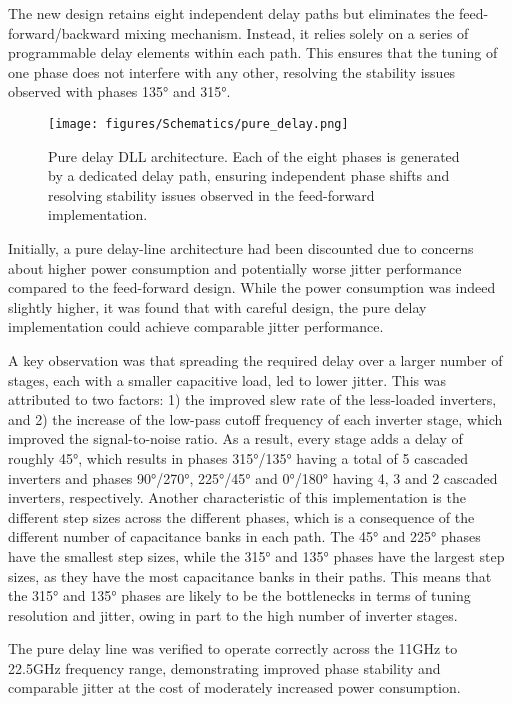 The new design retains eight independent delay paths but eliminates the feed-forward/backward mixing mechanism. Instead, it relies solely on a series of programmable delay elements within each path. This ensures that the tuning of one phase does not interfere with any other, resolving the stability issues observed with phases \ang{135} and \ang{315}.

\begin{figure}[H]
  \centering
  \texttt{[image: figures/Schematics/pure\_delay.png]}
  \caption{Pure delay DLL architecture. Each of the eight phases is generated by a dedicated delay path, ensuring independent phase shifts and resolving stability issues observed in the feed-forward implementation.}
  \label{fig:pure_delay}
\end{figure}


Initially, a pure delay-line architecture had been discounted due to concerns about higher power consumption and potentially worse jitter performance compared to the feed-forward design. While the power consumption was indeed slightly higher, it was found that with careful design, the pure delay implementation could achieve comparable jitter performance.

A key observation was that spreading the required delay over a larger number of stages, each with a smaller capacitive load, led to lower jitter. This was attributed to two factors: 1) the improved slew rate of the less-loaded inverters, and 2) the increase of the low-pass cutoff frequency of each inverter stage, which improved the signal-to-noise ratio. As a result, every stage adds a delay of roughly \ang{45}, which results in phases \ang{315}/\ang{135} having a total of 5 cascaded inverters and phases \ang{90}/\ang{270}, \ang{225}/\ang{45} and \ang{0}/\ang{180} having 4, 3 and 2 cascaded inverters, respectively.
Another characteristic of this implementation is the different step sizes across the different phases, which is a consequence of the different number of capacitance banks in each path. The \ang{45} and \ang{225} phases have the smallest step sizes, while the \ang{315} and \ang{135} phases have the largest step sizes, as they have the most capacitance banks in their paths. This means that the \ang{315} and \ang{135} phases are likely to be the bottlenecks in terms of tuning resolution and jitter, owing in part to the high number of inverter stages.

The pure delay line was verified to operate correctly across the 11GHz to 22.5GHz frequency range, demonstrating improved phase stability and comparable jitter at the cost of moderately increased power consumption.

